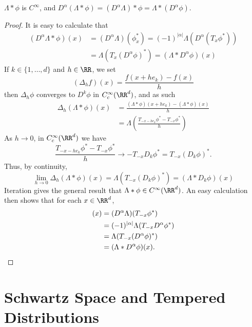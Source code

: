 \begin{theorem}
    $\Lambda * \phi$ is $C^\infty$, and $D^\alpha(\Lambda * \phi) = (D^\alpha \Lambda) * \phi = \Lambda * (D^\alpha \phi)$.
\end{theorem}
\begin{proof}
    It is easy to calculate that
    \begin{align*}
        (D^\alpha \Lambda * \phi)(x) &= (D^\alpha \Lambda)(\phi^*_x) = (-1)^{|\alpha|} \Lambda(D^\alpha (T_x \phi^*))\\
        &= \Lambda(T_x (D^\alpha \phi)^*) = (\Lambda * D^\alpha \phi)(x)
    \end{align*}
    If $k \in \{ 1, \dots, d \}$ and $h \in \RR$, we set
    \[ (\Delta_h f)(x) = \frac{f(x + he_k) - f(x)}{h} \]
    then $\Delta_h \phi$ converges to $D^k \phi$ in $C_c^\infty(\RR^d)$, and as such
    \begin{align*}
      \Delta_h(\Lambda * \phi)(x) &= \frac{(\Lambda * \phi)(x + he_k) - (\Lambda * \phi)(x)}{ h}\\
      &= \Lambda \left( \frac{T_{-x - he_k} \phi^* - T_{-x} \phi^*}{h} \right)
    \end{align*}
    As $h \to 0$, in $C_c^\infty(\RR^d)$ we have
    \[ \frac{T_{-x - he_k} \phi^* - T_{-x} \phi^*}{h} \to - T_{-x} D_k \phi^* = T_{-x} (D_k \phi)^*. \]
    Thus, by continuity,
    \[ \lim_{h \to 0} \Delta_h(\Lambda * \phi)(x) = \Lambda(T_{-x} (D_k \phi)^*) = (\Lambda * D_k \phi)(x) \]
    Iteration gives the general result that $\Lambda * \phi \in C^\infty(\RR^d)$. An easy calculation then shows that for each $x \in \RR^d$,
    \begin{align*}
      [(D^\alpha \Lambda) * \phi](x) &= (D^\alpha \Lambda)(T_{-x} \phi^*)\\
      &= (-1)^{|\alpha|} \Lambda(T_{-x} D^\alpha \phi^*)\\
      &= \Lambda(T_{-x} (D^\alpha \phi)^*)\\
      &= (\Lambda * D^\alpha \phi)(x). \qedhere
    \end{align*}
\end{proof}

\section{Schwartz Space and Tempered Distributions}

